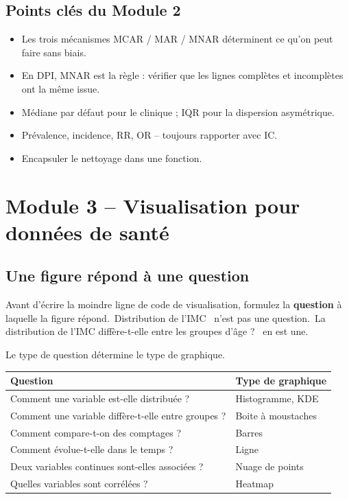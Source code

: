 \documentclass[11pt,a4paper]{article}
\providecommand{\og}{\guillemotleft\,}
\providecommand{\fg}{\,\guillemotright}
\begin{document}
\subsection{Points cl\'es du Module 2}

\begin{itemize}
  \item Les trois m\'ecanismes MCAR / MAR / MNAR d\'eterminent ce qu'on
        peut faire sans biais.
  \item En DPI, MNAR est la r\`egle : v\'erifier que les lignes
        compl\`etes et incompl\`etes ont la m\^eme issue.
  \item M\'ediane par d\'efaut pour le clinique ; IQR pour la dispersion
        asym\'etrique.
  \item Pr\'evalence, incidence, RR, OR -- toujours rapporter avec IC.
  \item Encapsuler le nettoyage dans une fonction.
\end{itemize}

\newpage


\section{Module 3 -- Visualisation pour donn\'ees de sant\'e}

\subsection{Une figure r\'epond \`a une question}

Avant d'\'ecrire la moindre ligne de code de visualisation, formulez la
\textbf{question} \`a laquelle la figure r\'epond. \og Distribution de
l'IMC \fg{} n'est pas une question. \og La distribution de l'IMC
diff\`ere-t-elle entre les groupes d'\^age ? \fg{} en est une.

Le type de question d\'etermine le type de graphique.

\begin{table}[h]
\centering
\small
\begin{tabular}{ll}
\toprule
\bfseries Question & \bfseries Type de graphique \\
\midrule
Comment une variable est-elle distribu\'ee ?      & Histogramme, KDE \\
Comment une variable diff\`ere-t-elle entre groupes ? & Boite \`a moustaches \\
Comment compare-t-on des comptages ?              & Barres \\
Comment \'evolue-t-elle dans le temps ?           & Ligne \\
Deux variables continues sont-elles associ\'ees ? & Nuage de points \\
Quelles variables sont corr\'el\'ees ?            & Heatmap \\
\bottomrule
\end{tabular}
\end{table}
\end{document}
